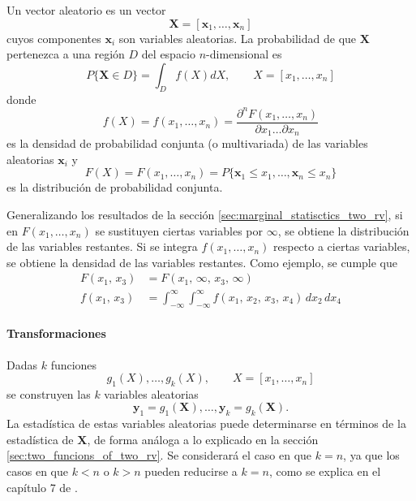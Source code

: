 \documentclass[a4paper]{report}
\newcommand{\X}{\mathbf{X}}
\newcommand{\x}{\mathbf{x}}
\newcommand{\y}{\mathbf{y}}
\begin{document}
Un vector aleatorio es un vector
\[
 \X=[\x_1,\dots,\x_n]
\]
cuyos componentes \(\x_i\) son variables aleatorias. La probabilidad de que \(\X\) pertenezca a una región \(D\) del espacio \(n\)-dimensional es
\[
 P\{\X\in D\}=\int_Df(X)dX,\qquad X=[x_1,\dots, x_n]
\]
donde 
\[
 f(X)=f(x_1,\dots,x_n)=\frac{\partial^nF(x_1,\dots,x_n)}{\partial x_1\dots\partial x_n}
\]
es la densidad de probabilidad conjunta (o multivariada) de las variables aleatorias \(\x_i\) y 
\[
 F(X)=F(x_1,\dots,x_n)=P\{\x_1\leq x_1,\dots,\x_n\leq x_n\}
\]
es la distribución de probabilidad conjunta.

Generalizando los resultados de la sección \ref{sec:marginal_statisctics_two_rv}, si en \(F(x_1,\dots,x_n)\) se sustituyen ciertas variables por \(\infty\), se obtiene la distribución de las variables restantes. Si se integra \(f(x_1,\dots,x_n)\) respecto a ciertas variables, se obtiene la densidad de las variables restantes. Como ejemplo, se cumple que
\begin{equation}\label{eq:marginal_statisctics_sequence_rv}
 \begin{aligned}
 F(x_1,\,x_3)&=F(x_1,\,\infty,\,x_3,\,\infty)\\
 f(x_1,\,x_3)&=\int_{-\infty}^{\infty}\int_{-\infty}^{\infty}f(x_1,\,x_2,\,x_3,\,x_4)\,dx_2\,dx_4
 \end{aligned}
\end{equation}

\paragraph{Transformaciones} Dadas \(k\) funciones 
\[
 g_1(X),\dots,g_k(X),\qquad X=[x_1,\dots,x_n]
\]
se construyen las \(k\) variables aleatorias
\[
 \y_1=g_1(\X),\dots,\y_k=g_k(\X).
\]
La estadística de estas variables aleatorias puede determinarse en términos de la estadística de \(\X\), de forma análoga a lo explicado en la sección \ref{sec:two_funcions_of_two_rv}. Se considerará el caso en que \(k=n\), ya que los casos en que \(k<n\) o \(k>n\) pueden reducirse a \(k=n\), como se explica en el capítulo 7 de \cite{papoulis2002probability}. 
\end{document}
